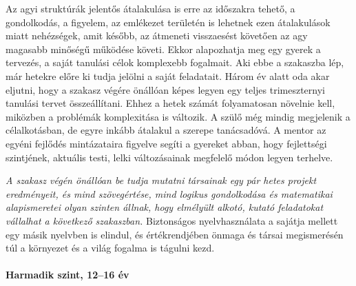 Az agyi struktúrák jelentős átalakulása is erre az időszakra tehető, a gondolkodás, a figyelem, az emlékezet területén is lehetnek ezen átalakulások miatt nehézségek, amit később, az átmeneti visszaesést követően az agy magasabb minőségű működése követi. Ekkor alapozhatja meg egy gyerek a tervezés, a saját tanulási célok komplexebb fogalmait. Aki ebbe a szakaszba lép, már hetekre előre ki tudja jelölni a saját feladatait. Három év alatt oda akar eljutni, hogy a szakasz végére önállóan képes legyen egy teljes trimeszternyi tanulási tervet összeállítani. Ehhez a hetek számát folyamatosan növelnie kell, miközben a problémák komplexitása is változik. A szülő még mindig megjelenik a célalkotásban, de egyre inkább átalakul a szerepe tanácsadóvá. A mentor az egyéni fejlődés mintázataira figyelve segíti a gyereket abban, hogy fejlettségi szintjének, aktuális testi, lelki változásainak megfelelő módon legyen terhelve.

\emph{A szakasz végén önállóan be tudja mutatni társainak egy pár hetes projekt eredményeit, és mind szövegértése, mind logikus gondolkodása és matematikai alapismeretei olyan szinten állnak, hogy elmélyült alkotó, kutató feladatokat vállalhat a következő szakaszban.} Biztonságos nyelvhasználata a sajátja mellett egy másik nyelvben is elindul, és értékrendjében önmaga és társai megismerésén túl a környezet és a világ fogalma is tágulni kezd.

\paragraph{Harmadik szint, 12--16 év}

